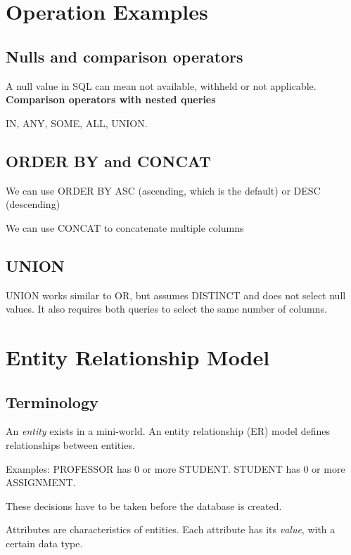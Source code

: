 \documentclass[english,openany]{book}
\begin{document}
    \chapter{Operation Examples}

    \section{Nulls and comparison operators}

    A null value in SQL can mean not available, withheld or not applicable.\\

    \textbf{Comparison operators with nested queries}

    IN, ANY, SOME, ALL, UNION.

   \section{ORDER BY and CONCAT}

    We can use ORDER BY  ASC (ascending, which is the default) or DESC (descending)

    We can use CONCAT to concatenate multiple columns

    \section{UNION}

    UNION works similar to OR, but assumes DISTINCT and does not select null values. It also requires both queries to select the same number of columns.

    \chapter{Entity Relationship Model}

    \section{Terminology}

    An \textit{entity} exists in a mini-world. An entity relationship (ER) model defines relationships between entities.

    Examples: PROFESSOR has 0 or more STUDENT. STUDENT has 0 or more ASSIGNMENT.

    These decisions have to be taken before the database is created.

    Attributes are characteristics of entities. Each attribute has its \textit{value}, with a certain data type.
\end{document}
